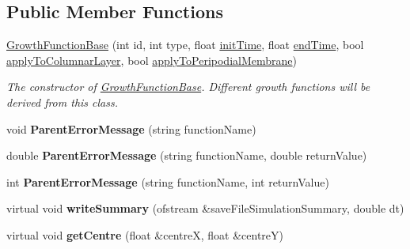 \subsection*{Public Member Functions}
\begin{DoxyCompactItemize}
\item 
\hyperlink{classGrowthFunctionBase_a061b31ad8a0cb228628c7104029a94bf}{Growth\+Function\+Base} (int id, int type, float \hyperlink{classGrowthFunctionBase_ae92513a7b41637df8e26e7db35ddf97c}{init\+Time}, float \hyperlink{classGrowthFunctionBase_a3ff4db0573d354a75666a5f3ca446941}{end\+Time}, bool \hyperlink{classGrowthFunctionBase_a3d56771e7c145589a14e11cc331e0326}{apply\+To\+Columnar\+Layer}, bool \hyperlink{classGrowthFunctionBase_a08ae19f58cb98fa8e315a77f52749732}{apply\+To\+Peripodial\+Membrane})
\begin{DoxyCompactList}\small\item\em The constructor of \hyperlink{classGrowthFunctionBase}{Growth\+Function\+Base}. Different growth functions will be derived from this class. \end{DoxyCompactList}\item 
\hypertarget{classGrowthFunctionBase_ad5b4e88d33c4b72444c5c25c25ab68fb}{}void {\bfseries Parent\+Error\+Message} (string function\+Name)\label{classGrowthFunctionBase_ad5b4e88d33c4b72444c5c25c25ab68fb}

\item 
\hypertarget{classGrowthFunctionBase_aed234af9feb797628d4a2d598dcf9632}{}double {\bfseries Parent\+Error\+Message} (string function\+Name, double return\+Value)\label{classGrowthFunctionBase_aed234af9feb797628d4a2d598dcf9632}

\item 
\hypertarget{classGrowthFunctionBase_a9097ca54f854aa0d1c8d220c971580dd}{}int {\bfseries Parent\+Error\+Message} (string function\+Name, int return\+Value)\label{classGrowthFunctionBase_a9097ca54f854aa0d1c8d220c971580dd}

\item 
\hypertarget{classGrowthFunctionBase_abd31142fe0bcc9a95a39c85cb55438a8}{}virtual void {\bfseries write\+Summary} (ofstream \&save\+File\+Simulation\+Summary, double dt)\label{classGrowthFunctionBase_abd31142fe0bcc9a95a39c85cb55438a8}

\item 
\hypertarget{classGrowthFunctionBase_aa031bd3d28993402ee5bdb3d8cae7fa6}{}virtual void {\bfseries get\+Centre} (float \&centre\+X, float \&centre\+Y)\label{classGrowthFunctionBase_aa031bd3d28993402ee5bdb3d8cae7fa6}


\end{DoxyCompactItemize}
